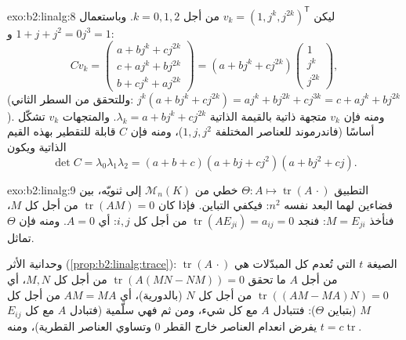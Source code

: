 \begin{solution}{exo:b2:linalg:8}
ليكن $v_k = (1, j^k, j^{2k})^{\mathsf T}$ من أجل $k = 0, 1, 2$. وباستعمال $1
+ j + j^2 = 0$ و$j^3 = 1$:
\[
C v_k =
\begin{pmatrix}
a + b j^k + c j^{2k}\\
c + a j^k + b j^{2k}\\
b + c j^k + a j^{2k}
\end{pmatrix}
= (a + b j^k + c j^{2k})
\begin{pmatrix} 1\\ j^k\\ j^{2k}\end{pmatrix},
\]
(وللتحقق من السطر الثاني: $j^k(a + bj^k + cj^{2k}) = aj^k + bj^{2k} +
cj^{3k} = c + aj^k + bj^{2k}$). ومنه فإن $v_k$ متجهة ذاتية
بالقيمة الذاتية $\lambda_k = a + bj^k + cj^{2k}$. والمتجهات $v_k$ تشكّل أساسًا
(فاندرموند للعناصر المختلفة $1, j, j^2$)، ومنه فإن $C$ قابلة للتقطير
بهذه القيم الذاتية ويكون
\[
\det C = \lambda_0\lambda_1\lambda_2
= (a+b+c)(a + bj + cj^2)(a + bj^2 + cj).
\]
\end{solution}

\begin{solution}{exo:b2:linalg:9}
التطبيق $\Theta \colon A \mapsto \operatorname{tr}(A\,\cdot)$
خطي من $\mathcal{M}_n(K)$ إلى ثنويّه، بين فضاءين لهما البعد نفسه
$n^2$: فيكفي التباين. فإذا كان $\operatorname{tr}(AM) =
0$ من أجل كل $M$، فنأخذ $M = E_{ji}$: فنجد $\operatorname{tr}(A E_{ji}) =
a_{ij} = 0$ من أجل كل $i, j$: أي $A = 0$. ومنه فإن $\Theta$ تماثل.

وحدانية الأثر (\cref{prop:b2:linalg:trace}): الصيغة $t$
التي تُعدم كل المبدّلات هي $\operatorname{tr}(A\,\cdot)$ من أجل
$A$ ما تحقق $\operatorname{tr}(A(MN - NM)) = 0$ من أجل كل $M, N$، أي
$\operatorname{tr}((AM - MA)N) = 0$ من أجل كل $N$ (بالدورية)، أي
$AM = MA$ من أجل كل $M$ (بتباين $\Theta$): فتتبادل $A$ مع
كل شيء، ومن ثم فهي سلّمية (فتبادل $A$ مع كل $E_{ij}$ يفرض
انعدام العناصر خارج القطر $0$ وتساوي العناصر القطرية)، ومنه $t = c
\operatorname{tr}$.
\end{solution}


